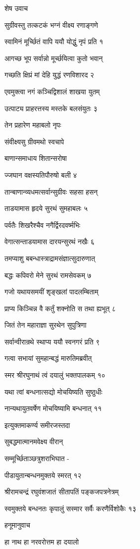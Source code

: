 
शेष उवाच

सुग्रीवस्तु तत्कटकं भग्नं वीक्ष्य रणाङ्गणे

स्वामिनं मूर्च्छितं वापि ययौ योद्धुं नृपं प्रति १

आगच्छ भूप सर्वान्नो मूर्च्छयित्वा कुतो भवान्

गच्छति क्षिप्रं मां देहि युद्धं रणविशारद २

एवमुक्त्वा नगं कञ्चिद्विशालं शाखया युतम्

उत्पाट्य प्राहरत्तस्य मस्तके बलसंयुतः ३

तेन प्रहारेण महाबलो नृपः

संवीक्ष्यसु ग्रीवमथो स्वचापे

बाणान्समाधाय शितान्सरोषा

ज्जघान वक्षस्यतिपौरुषो बली ४

तान्बाणान्व्यधमत्सर्वान्सुग्रीवः सहसा हसन्

ताडयामास हृदये सुरथं सुमहाबलः ५

पर्वतैः शिखरैश्चैव नगैर्द्विरदवर्ष्मभिः

वेगात्सन्ताडयामास दारयन्सुरथं नखैः ६

तमप्याशु बबन्धास्त्राद्रामसंज्ञात्सुदारुणात्

बद्धः कपिवरो मेने सुरथं रामसेवकम् ७

गजो यथायसमयीं शृङ्खलां पादलम्बिताम्

प्राप्य किञ्चिन्न वै कर्तुं शक्नोति स तथा ह्यभूत् ८

जितं तेन महाराज्ञा सुरथेन सुपुत्रिणा

सर्वान्वीरान्रथे स्थाप्य ययौ स्वनगरं प्रति ९

गत्वा सभायां सुमहान्बद्धं मारुतिमब्रवीत्

स्मर श्रीरघुनाथं त्वं दयालुं भक्तपालकम् १०

यथा त्वां बन्धनात्सद्यो मोचयिष्यति सुष्ठुधीः

नान्यथायुतवर्षेण मोचयिष्यामि बन्धनात् ११

इत्युक्तमाकर्ण्य समीरजस्तदा

सुबद्धमात्मानमवेक्ष्य वीरान्

सम्मूर्च्छिताञ्छत्रुशराभिघात -

पीडायुतान्बन्धनमुक्तये स्मरत् १२

श्रीरामचन्द्रं रघुवंशजातं सीतापतिं पङ्कजपत्रनेत्रम्

स्वमुक्तये बन्धनतः कृपालुं सस्मार सर्वैः करणैर्विशोकैः १३

हनूमानुवाच

हा नाथ हा नरवरोत्तम हा दयालो

